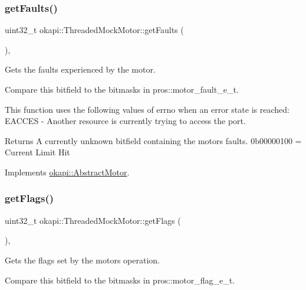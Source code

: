 \subsubsection{\texorpdfstring{getFaults()}{getFaults()}}
{\footnotesize\ttfamily uint32\+\_\+t okapi\+::\+Threaded\+Mock\+Motor\+::get\+Faults (\begin{DoxyParamCaption}{ }\end{DoxyParamCaption})\hspace{0.3cm}{\ttfamily [override]}, {\ttfamily [virtual]}}



Gets the faults experienced by the motor. 

Compare this bitfield to the bitmasks in pros\+::motor\+\_\+fault\+\_\+e\+\_\+t.

This function uses the following values of errno when an error state is reached\+: E\+A\+C\+C\+ES -\/ Another resource is currently trying to access the port.

\begin{DoxyReturn}{Returns}
A currently unknown bitfield containing the motor\textquotesingle{}s faults. 0b00000100 = Current Limit Hit 
\end{DoxyReturn}


Implements \mbox{\hyperlink{classokapi_1_1AbstractMotor_ae741463ec8de88c4f7ba854b5d6d7bce}{okapi\+::\+Abstract\+Motor}}.

\mbox{\label{classokapi_1_1ThreadedMockMotor_a305a97d40b24de7ed61b2cd499746f83}} 
\subsubsection{\texorpdfstring{getFlags()}{getFlags()}}
{\footnotesize\ttfamily uint32\+\_\+t okapi\+::\+Threaded\+Mock\+Motor\+::get\+Flags (\begin{DoxyParamCaption}{ }\end{DoxyParamCaption})\hspace{0.3cm}{\ttfamily [override]}, {\ttfamily [virtual]}}



Gets the flags set by the motor\textquotesingle{}s operation. 

Compare this bitfield to the bitmasks in pros\+::motor\+\_\+flag\+\_\+e\+\_\+t.

